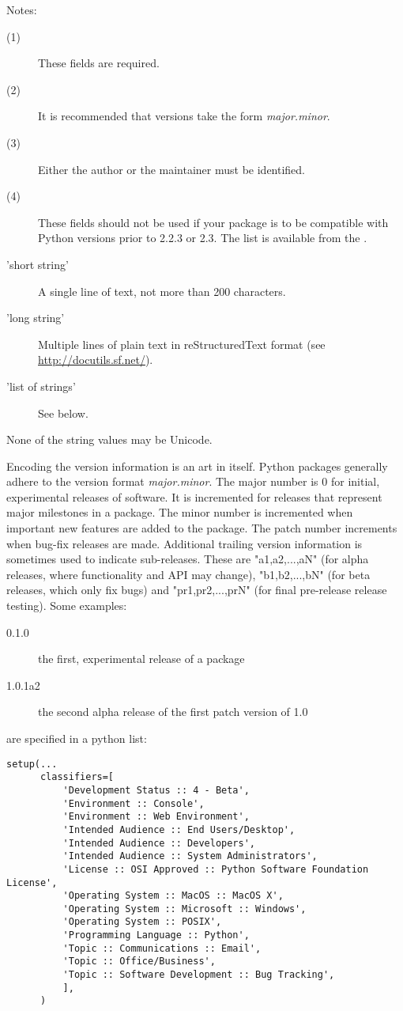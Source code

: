 \documentclass{manual}
\begin{document}
\noindent Notes:
\begin{description}
\item[(1)] These fields are required.
\item[(2)] It is recommended that versions take the form
  \emph{major.minor}.
\item[(3)] Either the author or the maintainer must be identified.
\item[(4)] These fields should not be used if your package is to be
  compatible with Python versions prior to 2.2.3 or 2.3.  The list is
  available from the .

\item['short string'] A single line of text, not more than 200 characters.
\item['long string'] Multiple lines of plain text in reStructuredText
  format (see \url{http://docutils.sf.net/}).
\item['list of strings'] See below.
\end{description}

None of the string values may be Unicode.

Encoding the version information is an art in itself. Python packages
generally adhere to the version format
\emph{major.minor}. The major number is
0 for
initial, experimental releases of software. It is incremented for
releases that represent major milestones in a package. The minor
number is incremented when important new features are added to the
package. The patch number increments when bug-fix releases are
made. Additional trailing version information is sometimes used to
indicate sub-releases.  These are "a1,a2,...,aN" (for alpha releases,
where functionality and API may change), "b1,b2,...,bN" (for beta
releases, which only fix bugs) and "pr1,pr2,...,prN" (for final
pre-release release testing). Some examples:

\begin{description}
\item[0.1.0] the first, experimental release of a package
\item[1.0.1a2] the second alpha release of the first patch version of 1.0
\end{description}

 are specified in a python list:

\begin{verbatim}
setup(...
      classifiers=[
          'Development Status :: 4 - Beta',
          'Environment :: Console',
          'Environment :: Web Environment',
          'Intended Audience :: End Users/Desktop',
          'Intended Audience :: Developers',
          'Intended Audience :: System Administrators',
          'License :: OSI Approved :: Python Software Foundation License',
          'Operating System :: MacOS :: MacOS X',
          'Operating System :: Microsoft :: Windows',
          'Operating System :: POSIX',
          'Programming Language :: Python',
          'Topic :: Communications :: Email',
          'Topic :: Office/Business',
          'Topic :: Software Development :: Bug Tracking',
          ],
      )
\end{verbatim}
\end{document}
